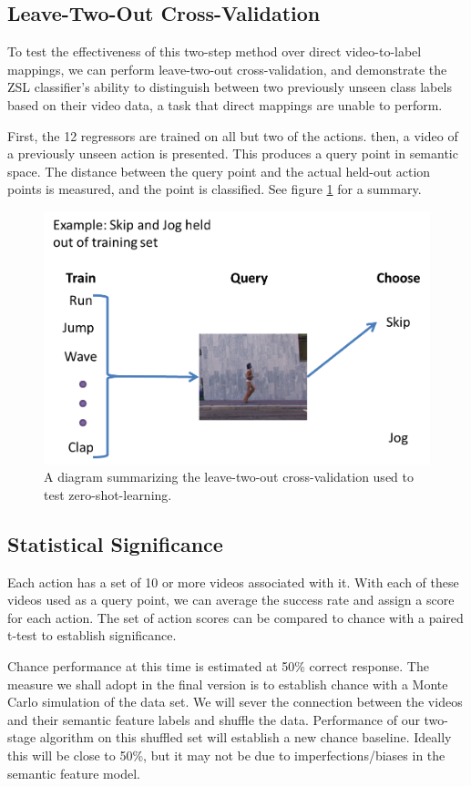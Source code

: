\documentclass{article}
\begin{document}
\subsection{Leave-Two-Out Cross-Validation}
To test the effectiveness of this two-step method over direct video-to-label mappings, we can perform leave-two-out cross-validation, and demonstrate the ZSL classifier’s ability to distinguish between two previously unseen class labels based on their video data, a task that direct mappings are unable to perform.

First, the 12 regressors are trained on all but two of the actions.  then, a video of a previously unseen action is presented. This produces a query point in semantic space.  The distance between the query point and the actual held-out action points is measured, and the point is classified. See figure \ref{ltocv} for a summary.

\begin{figure}[h]
\centering
\includegraphics[width = .3\linewidth]{ltocv}
\caption{A diagram summarizing the leave-two-out cross-validation used to test zero-shot-learning.}
\label{ltocv}
\end{figure}
\subsection{Statistical Significance}
Each action has a set of 10 or more videos associated with it. With each of these videos used as a query point, we can average the success rate and assign a score for each action. The set of action scores can be compared to chance with a paired t-test to establish significance.

Chance performance at this time is estimated at 50\% correct response.  The measure we shall adopt in the final version is to establish chance with a Monte Carlo simulation of the data set. We will sever the connection between the videos and their semantic feature labels and shuffle the data. Performance of our two-stage algorithm on this shuffled set will establish a new chance baseline. Ideally this will be close to 50\%, but it may not be due to imperfections/biases in the semantic feature model.
\label{stats}
\end{document}
